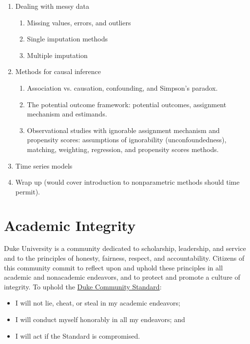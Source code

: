 \documentclass[11pt, a4paper]{article}
\begin{document}
\begin{enumerate}[label= {\color{darkblue}{\ArrowBoldRightStrobe}}]
\begin{enumerate}[label= {\color{cyan}{\Rectangle}}]
	\end{enumerate}
	\item Dealing with messy data
	\begin{enumerate}[label= {\color{cyan}{\Rectangle}}]
		\item Missing values, errors, and outliers
		\item Single imputation methods
		\item Multiple imputation
	\end{enumerate}
	\item Methods for causal inference
	\begin{enumerate}[label= {\color{cyan}{\Rectangle}}]
		\item Association vs. causation, confounding, and Simpson's paradox.
		\item The potential outcome framework: potential outcomes, assignment mechanism and estimands.
		\item Observational studies with ignorable assignment mechanism and propensity scores: assumptions of ignorability (unconfoundedness), matching, weighting, regression, and propensity scores methods. 
	\end{enumerate}
	\item Time series models
	\item Wrap up (would cover introduction to nonparametric methods should time permit).
\end{enumerate}


\section{Academic Integrity}  
Duke University is a community dedicated to scholarship, leadership, and service and to the principles of honesty, fairness, respect, and accountability. Citizens of this community commit to reflect upon and uphold these principles in all academic and nonacademic endeavors, and to protect and promote a culture of integrity. To uphold the \href{https://studentaffairs.duke.edu/conduct/about-us/duke-community-standard}{Duke Community Standard}:
\begin{itemize}[label= {\color{darkred}{\Large \HandRight}}]
	\item I will not lie, cheat, or steal in my academic endeavors;
	\item I will conduct myself honorably in all my endeavors; and
	\item I will act if the Standard is compromised.
\end{itemize}
\end{document}
